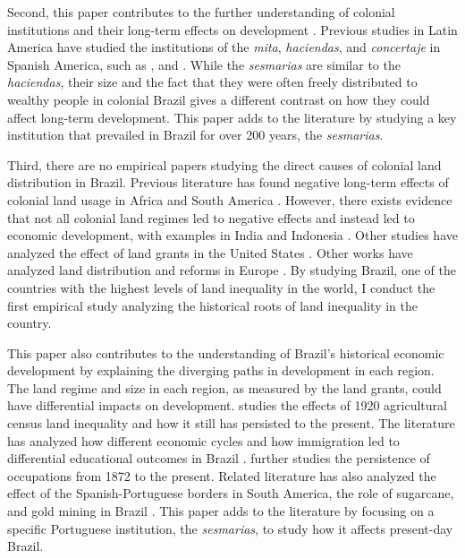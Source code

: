 \documentclass[11pt]{article}
\begin{document}
Second, this paper contributes to the further understanding of colonial institutions and their long-term effects on development \parencites{Engerman2002-ju}{Acemoglu2005-ti}.
Previous studies in Latin America have studied the institutions of the \textit{mita}, \textit{haciendas}, and \textit{concertaje} in Spanish America, such as \textcite{Dell2010-qt}, \textcite{Faguet2022-sr} and \textcite{Rivadeneira2024-uj}.
While the \textit{sesmarias} are similar to the \textit{haciendas}, their size and the fact that they were often freely distributed to wealthy people in colonial Brazil gives a different contrast on how they could affect long-term development.
This paper adds to the literature by studying a key institution that prevailed in Brazil for over 200 years, the \textit{sesmarias}.


Third, there are no empirical papers studying the direct causes of colonial land distribution in Brazil. 
Previous literature has found negative long-term effects of colonial land usage in Africa and South America \parencites{Dell2010-qt}{Lowes2021-ww}{Montero2022-ua}. 
However, there exists evidence that not all colonial land regimes led to negative effects and instead led to economic development, with examples in India and Indonesia \parencites{Banerjee2005-ki}{Dell2020-zo}{Ratnoo2023-vw}.  
Other studies have analyzed the effect of land grants in the United States \parencites{Akee2014-uw}{Allen2019-kh}{Smith2023-ip}. 
Other works have analyzed land distribution and reforms in Europe \parencites{Reed2012-qy}{Goni2022-do}.
By studying Brazil, one of the countries with the highest levels of land inequality in the world, I conduct the first empirical study analyzing the historical roots of land inequality in the country.

This paper also contributes to the understanding of Brazil's historical economic development by explaining the diverging paths in development in each region. 
The land regime and size in each region, as measured by the land grants, could have differential impacts on development.
\textcite{Wigton-Jones2020-ex} studies the effects of 1920 agricultural census land inequality and how it still has persisted to the present.
The literature has analyzed how different economic cycles and how immigration led to differential educational outcomes in Brazil \parencites{Musacchio2014-pq}{Rocha2017-yq}{de-Carvalho-Filho2012-pc}.
\textcite{Ehrl2019-zp} further studies the persistence of occupations from 1872 to the present.
Related literature has also analyzed the effect of the Spanish-Portuguese borders in South America, the role of sugarcane, and gold mining in Brazil \parencites{Laudares2023-wl}{Naritomi2012-or}.
This paper adds to the literature by focusing on a specific Portuguese institution, the \textit{sesmarias}, to study how it affects present-day Brazil.
\end{document}
